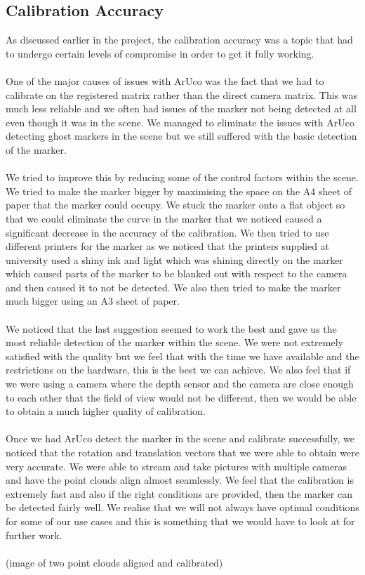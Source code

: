 \documentclass{article}
\begin{document}
\subsection{Calibration Accuracy}
As discussed earlier in the project, the calibration accuracy was a topic that had to undergo certain levels of compromise in order to get it fully working.
\\\\
One of the major causes of issues with ArUco was the fact that we had to calibrate on the registered matrix rather than the direct camera matrix. This was much less reliable and we often had issues of the marker not being detected at all even though it was in the scene. We managed to eliminate the issues with ArUco detecting ghost markers in the scene but we still suffered with the basic detection of the marker.
\\\\
We tried to improve this by reducing some of the control factors within the scene. We tried to make the marker bigger by maximising the space on the A4 sheet of paper that the marker could occupy. We stuck the marker onto a flat object so that we could eliminate the curve in the marker that we noticed caused a significant decrease in the accuracy of the calibration. We then tried to use different printers for the marker as we noticed that the printers supplied at university used a shiny ink and light which was shining directly on the marker which caused parts of the marker to be blanked out with respect to the camera and then caused it to not be detected. We also then tried to make the marker much bigger using an A3 sheet of paper.
\\\\
We noticed that the last suggestion seemed to work the best and gave us the most reliable detection of the marker within the scene. We were not extremely satisfied with the quality but we feel that with the time we have available and the restrictions on the hardware, this is the best we can achieve. We also feel that if we were using a camera where the depth sensor and the camera are close enough to each other that the field of view would not be different, then we would be able to obtain a much higher quality of calibration.
\\\\
Once we had ArUco detect the marker in the scene and calibrate successfully, we noticed that the rotation and translation vectors that we were able to obtain were very accurate. We were able to stream and take pictures with multiple cameras and have the point clouds align almost seamlessly. We feel that the calibration is extremely fast and also if the right conditions are provided, then the marker can be detected fairly well. We realise that we will not always have optimal conditions for some of our use cases and this is something that we would have to look at for further work.
\\\\
(image of two point clouds aligned and calibrated)
\end{document}
